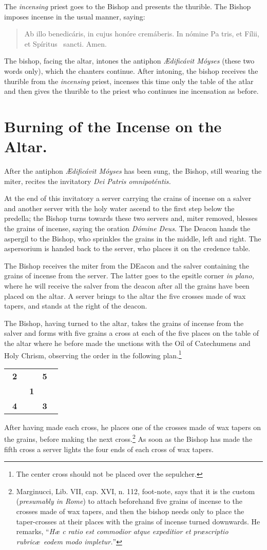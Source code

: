 \documentclass[letterpaper]{report}
\newcommand\blessincense{
\begin{quote}
   Ab illo benedicáris, in cujus honóre cremáberis. In nómine Pa\cross
    tris, et Fí\cross lii, et Spíritus \cross\ sancti. \rbar Amen.
\end{quote}
}
\newcommand\crossplan{
\begin{center}
    \begin{tabular}{ | l c r | }
       \hline
       \cross\ \textbf{2} &                    & \textbf{5} \cross\ \\
                          & \cross\ \textbf{1} &                    \\
       \cross\ \textbf{4} &                    & \textbf{3} \cross\ \\
       \hline
   \end{tabular} 
\end{center}
}
\begin{document}
{\rubric The \textit{incensing} priest goes to the Bishop and presents the
thurible. The Bishop imposes incense in the usual manner, saying:

\blessincense

The bishop, facing the altar, intones the antiphon \textit{\AE dificávit
Móyses} (these two words only), which the chanters continue. After intoning,
the bishop receives the thurible from the \textit{incensing} priest, incenses
this time only the table of the atlar and then gives the thurible to the priest
who continues ine incensation as before.

\section{Burning of the Incense on the Altar.}

\rubric After the antiphon \textit{\AE dificávit Móyses} has been sung, the
Bishop, still wearing the miter, recites the invitatory \textit{Dei Patris
omnipoténtis.}

\rubric At the end of this invitatory a server carrying the crains of incense
on a salver and another server with the holy water ascend to the first step
below the predella; the Bishop turns towards these two servers and, miter
removed, blesses the grains of incense, saying the oration \textit{Dómine
Deus.} The Deacon hands the aspergil to the Bishop, who sprinkles the grains in
the middle, left and right. The aspersorium is handed back to the server, who
places it on the credence table.

The Bishop receives the miter from the DEacon and the salver containing the
grains of incense from the server. The latter goes to the epsitle corner
\textit{in plano,} where he will receive the salver from the deacon after all
the grains have been placed on the altar. A server brings to the altar the five
crosses made of wax tapers, and stands at the right of the deacon.

\rubric The Bishop, having turned to the altar, takes the grains of incense
from the salver and forms with five grains a cross at each of the five places
on the table of the altar where he before made the unctions with the Oil of
Catechumens and Holy Chrism, observing the order in the following
plan.\footnote{The center cross should not be placed over the sepulcher.}

\crossplan

After having made each cross, he places one of the crosses made of wax tapers
on the grains, before making the next cross.\footnote{Marginucci, Lib. VII,
cap. XVI, n. 112, foot-note, says that it is the custom (\textit{presumably in
Rome}) to attach beforehand five grains of incense to the crosses made of wax
tapers, and then the bishop needs only to place the taper-crosses at their
places with the grains of incense turned downwards. He remarks, ``\textit{H\ae
c ratio est commodior atque expeditior et pr\ae scriptio rubric\ae\ eodem modo
impletur.}''} As soon as the Bishop has made the fifth cross a server lights
the four ends of each cross of wax tapers.

}
\end{document}
